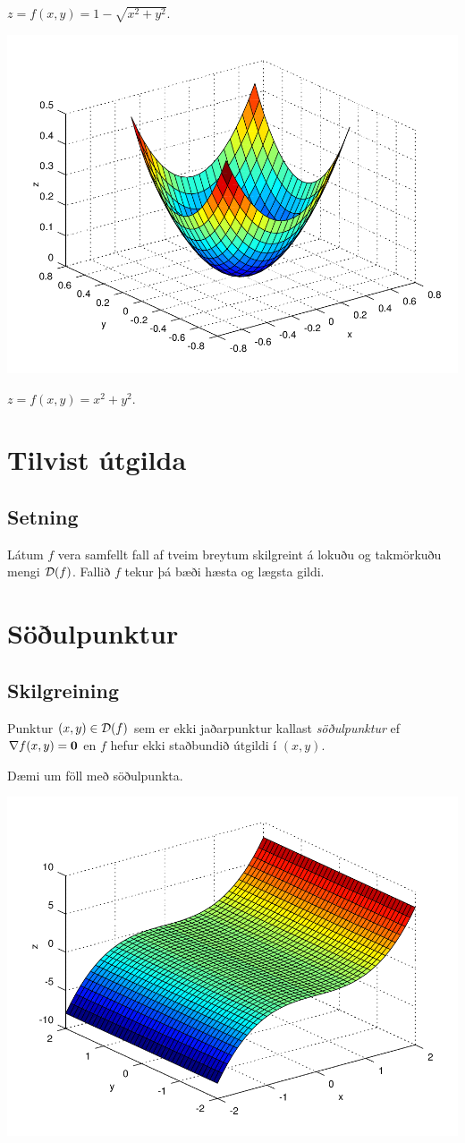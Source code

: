\documentclass[a4paper,10pt,icelandic]{sphinxmanual}
\begin{document}
\(z = f(x,y) = 1-\sqrt{x^2+y^2}\).

{\hfill\includegraphics[width=0.600\linewidth]{max_bound.png}\hfill}

\(z= f(x,y) = x^2+y^2\).


\section{Tilvist útgilda}
\label{Kafli3:tilvist-utgilda}

\subsection{Setning}
\label{Kafli3:id1}
Látum \(f\) vera samfellt fall af tveim breytum skilgreint á lokuðu
og takmörkuðu mengi \({\cal D}(f)\). Fallið \(f\) tekur þá bæði
hæsta og lægsta gildi.


\section{Söðulpunktur}
\label{Kafli3:soulpunktur}

\subsection{Skilgreining}
\label{Kafli3:id2}
Punktur \((x,y)\in  {\cal D}(f)\) sem er ekki jaðarpunktur kallast
\emph{söðulpunktur} ef \(\nabla f(x,y)=\mbox{${\bf 0}$}\) en \(f\)
hefur ekki staðbundið útgildi í \((x,y)\).

Dæmi um föll með söðulpunkta.

{\hfill\includegraphics[width=0.600\linewidth]{sodull1.png}\hfill}
\end{document}
